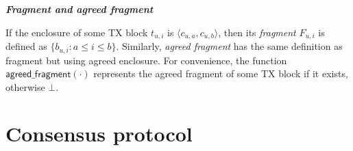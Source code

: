 
\begin{definition}
\textbf{\emph{Fragment and agreed fragment}}

If the enclosure of some TX block $t_{u, i}$ is $\langle c_{u,a}, c_{u, b} \rangle$,
then its \emph{fragment} $F_{u, i}$ is defined as $\{ b_{u, i} : a \le i \le b \}$.
Similarly, \emph{agreed fragment} has the same definition as fragment but using agreed enclosure.
For convenience, the function $\textsf{agreed\_fragment}(\cdot)$ represents the agreed fragment of some TX block if it exists, otherwise $\bot$.
\end{definition}


\section{Consensus protocol}
\label{sec:cons-protocol}


